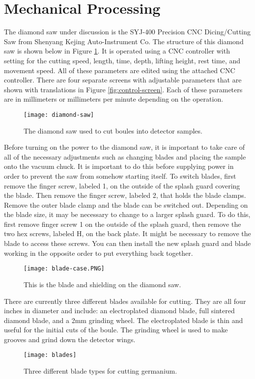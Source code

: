 \section{Mechanical Processing}
The diamond saw under discussion is the SYJ-400 Precision CNC Dicing/Cutting Saw from Shenyang Kejing Auto-Instrument Co.
The structure of this diamond saw is shown below in Figure \ref{fig:diamondsaw}.
It is operated using a CNC controller with setting for the cutting speed, length, time, depth, lifting height, rest time, and movement speed.
All of these parameters are edited using the attached CNC controller. 
There are four separate screens with adjustable parameters that are shown with translations in Figure \ref{fig:control-screen}. 
Each of these parameters are in millimeters or millimeters per minute depending on the operation.
\begin{figure}[htpb]
\centering
\texttt{[image: diamond-saw]}
\caption{The diamond saw used to cut boules into detector samples.}
\label{fig:diamondsaw}
\end{figure}

Before turning on the power to the diamond saw, it is important to take care of all of the necessary adjustments such as changing blades and placing the sample onto the vacuum chuck.
It is important to do this before supplying power in order to prevent the saw from somehow starting itself.
To switch blades, first remove the finger screw, labeled 1, on the outside of the splash guard covering the blade. Then remove the finger screw, labeled 2, that holds the blade clamps.
Remove the outer blade clamp and the blade can be switched out.
Depending on the blade size, it may be necessary to change to a larger splash guard.
To do this, first remove finger screw 1 on the outside of the splash guard, then remove the two hex screws, labeled H, on the back plate.
It might be necessary to remove the blade to access these screws.
You can then install the new splash guard and blade working in the opposite order to put everything back together.
\begin{figure}[htpb]
\centering
\texttt{[image: blade-case.PNG]}
\caption{This is the blade and shielding on the diamond saw.}
\label{fig:blade-case}
\end{figure}

There are currently three different blades available for cutting.
They are all four inches in diameter and include: an electroplated diamond blade, full sintered diamond blade, and a 2mm grinding wheel.
The electroplated blade is thin and useful for the initial cuts of the boule.
The grinding wheel is used to make grooves and grind down the detector wings.
\begin{figure}[htpb]
\centering
\texttt{[image: blades]}
\caption{Three different blade types for cutting germanium.}
\label{fig:blades}
\end{figure}

